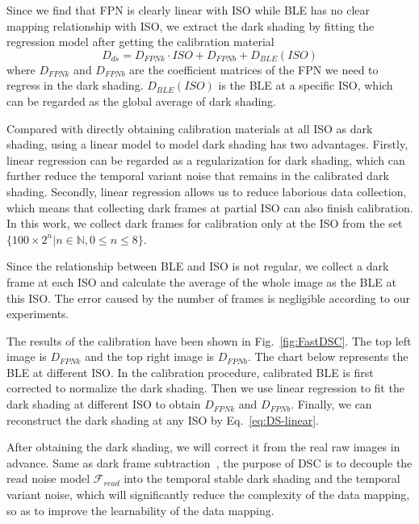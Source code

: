 \documentclass[sigconf,screen,nonacm]{acmart}
\begin{document}
Since we find that FPN is clearly linear with ISO while BLE has no clear mapping relationship with ISO, we extract the dark shading by fitting the regression model after getting the calibration material
    \begin{equation}\label{eq:DS-linear}
        D_{ds} = D_{FPNk} \cdot ISO + D_{FPNb} + D_{BLE}(ISO)
    \end{equation}
    where $D_{FPNk}$ and $D_{FPNb}$ are the coefficient matrices of the FPN we need to regress in the dark shading. $D_{BLE}(ISO)$ is the BLE at a specific ISO, which can be regarded as the global average of dark shading.

    Compared with directly obtaining calibration materials at all ISO as dark shading, using a linear model to model dark shading has two advantages.
    Firstly, linear regression can be regarded as a regularization for dark shading, which can further reduce the temporal variant noise that remains in the calibrated dark shading.
    Secondly, linear regression allows us to reduce laborious data collection, which means that collecting dark frames at partial ISO can also finish calibration.
    In this work, we collect dark frames for calibration only at the ISO from the set $\{100\times2^n | n\in \mathbb{N}, 0 \le n\le 8\}$.


    Since the relationship between BLE and ISO is not regular, we collect a dark frame at each ISO and calculate the average of the whole image as the BLE at this ISO. The error caused by the number of frames is negligible according to our experiments. 
    


    The results of the calibration have been shown in Fig.~\ref{fig:FastDSC}. The top left image is $D_{FPNk}$ and the top right image is $D_{FPNb}$. The chart below represents the BLE at different ISO.
    In the calibration procedure, calibrated BLE is first corrected to normalize the dark shading. Then we use linear regression to fit the dark shading at different ISO to obtain $D_{FPNk}$ and $D_{FPNb}$. Finally, we can reconstruct the dark shading at any ISO by Eq.~\eqref{eq:DS-linear}.

After obtaining the dark shading, we will correct it from the real raw images in advance.
Same as dark frame subtraction~\cite{naiveDSC,DFS}, the purpose of DSC is to decouple the read noise model $\mathcal F_{read}$ into the temporal stable dark shading and the temporal variant noise, which will significantly reduce the complexity of the data mapping, so as to improve the learnability of the data mapping.
\end{document}
